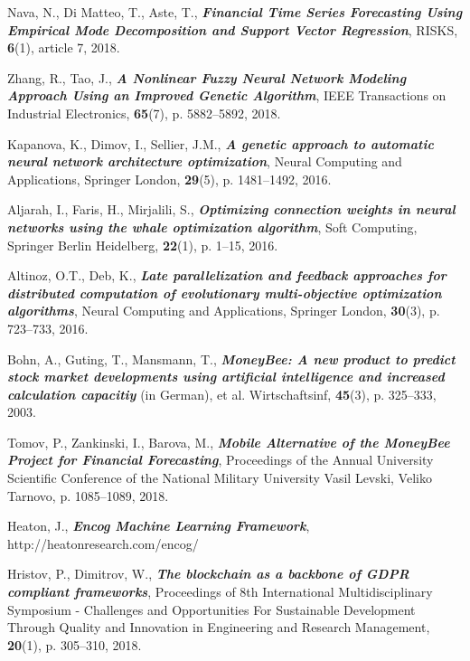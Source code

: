 \documentclass[runningheads]{llncs}
\begin{document}
\begin{thebibliography}{8}
 Nava, N., Di Matteo, T., Aste, T., \textbf{\textit{Financial Time Series Forecasting Using Empirical Mode Decomposition and Support Vector Regression}}, RISKS, \textbf{6}(1), article 7, 2018.

 Zhang, R., Tao, J., \textbf{\textit{A Nonlinear Fuzzy Neural Network Modeling Approach Using an Improved Genetic Algorithm}}, IEEE Transactions on Industrial Electronics, \textbf{65}(7), p. 5882--5892, 2018.

 Kapanova, K., Dimov, I., Sellier, J.M., \textbf{\textit{A genetic approach to automatic neural network architecture optimization}}, Neural Computing and Applications, Springer London, \textbf{29}(5), p. 1481--1492, 2016.

 Aljarah, I., Faris, H., Mirjalili, S., \textbf{\textit{Optimizing connection weights in neural networks using the whale optimization algorithm}}, Soft Computing, Springer Berlin Heidelberg, \textbf{22}(1), p. 1–15, 2016.

 Altinoz, O.T., Deb, K., \textbf{\textit{Late parallelization and feedback approaches for distributed computation of evolutionary multi-objective optimization algorithms}}, Neural Computing and Applications, Springer London, \textbf{30}(3), p. 723--733, 2016.

 Bohn, A., Guting, T., Mansmann, T., \textbf{\textit{MoneyBee: A new product to predict stock market developments using artificial intelligence and increased calculation capacitiy}} (in German), et al. Wirtschaftsinf, \textbf{45}(3), p. 325--333, 2003.

 Tomov, P., Zankinski, I., Barova, M., \textbf{\textit{Mobile Alternative of the MoneyBee Project for Financial Forecasting}}, Proceedings of the Annual University Scientific Conference of the National Military University Vasil Levski, Veliko Tarnovo, p. 1085--1089, 2018.

 Heaton, J., \textbf{\textit{Encog Machine Learning Framework}}, http://heatonresearch.com/encog/

 Hristov, P., Dimitrov, W., \textbf{\textit{The blockchain as a backbone of GDPR compliant frameworks}}, Proceedings of 8th International Multidisciplinary Symposium - Challenges and Opportunities For Sustainable Development Through Quality and Innovation in Engineering and Research Management, \textbf{20}(1), p. 305--310, 2018.


\end{thebibliography}
\end{document}
